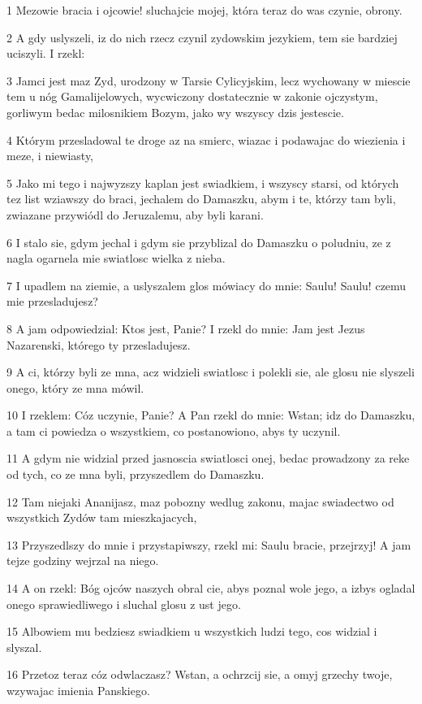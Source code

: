 \par 1 Mezowie bracia i ojcowie! sluchajcie mojej, która teraz do was czynie, obrony.
\par 2 A gdy uslyszeli, iz do nich rzecz czynil zydowskim jezykiem, tem sie bardziej uciszyli. I rzekl:
\par 3 Jamci jest maz Zyd, urodzony w Tarsie Cylicyjskim, lecz wychowany w miescie tem u nóg Gamalijelowych, wycwiczony dostatecznie w zakonie ojczystym, gorliwym bedac milosnikiem Bozym, jako wy wszyscy dzis jestescie.
\par 4 Którym przesladowal te droge az na smierc, wiazac i podawajac do wiezienia i meze, i niewiasty,
\par 5 Jako mi tego i najwyzszy kaplan jest swiadkiem, i wszyscy starsi, od których tez list wziawszy do braci, jechalem do Damaszku, abym i te, którzy tam byli, zwiazane przywiódl do Jeruzalemu, aby byli karani.
\par 6 I stalo sie, gdym jechal i gdym sie przyblizal do Damaszku o poludniu, ze z nagla ogarnela mie swiatlosc wielka z nieba.
\par 7 I upadlem na ziemie, a uslyszalem glos mówiacy do mnie: Saulu! Saulu! czemu mie przesladujesz?
\par 8 A jam odpowiedzial: Ktos jest, Panie? I rzekl do mnie: Jam jest Jezus Nazarenski, którego ty przesladujesz.
\par 9 A ci, którzy byli ze mna, acz widzieli swiatlosc i polekli sie, ale glosu nie slyszeli onego, który ze mna mówil.
\par 10 I rzeklem: Cóz uczynie, Panie? A Pan rzekl do mnie: Wstan; idz do Damaszku, a tam ci powiedza o wszystkiem, co postanowiono, abys ty uczynil.
\par 11 A gdym nie widzial przed jasnoscia swiatlosci onej, bedac prowadzony za reke od tych, co ze mna byli, przyszedlem do Damaszku.
\par 12 Tam niejaki Ananijasz, maz pobozny wedlug zakonu, majac swiadectwo od wszystkich Zydów tam mieszkajacych,
\par 13 Przyszedlszy do mnie i przystapiwszy, rzekl mi: Saulu bracie, przejrzyj! A jam tejze godziny wejrzal na niego.
\par 14 A on rzekl: Bóg ojców naszych obral cie, abys poznal wole jego, a izbys ogladal onego sprawiedliwego i sluchal glosu z ust jego.
\par 15 Albowiem mu bedziesz swiadkiem u wszystkich ludzi tego, cos widzial i slyszal.
\par 16 Przetoz teraz cóz odwlaczasz? Wstan, a ochrzcij sie, a omyj grzechy twoje, wzywajac imienia Panskiego.
